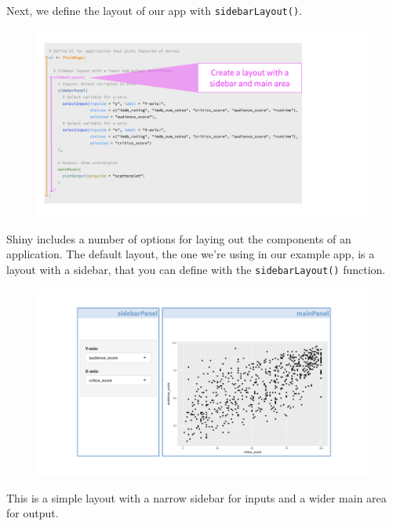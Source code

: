 \documentclass[
  letterpaper,
  DIV=11,
  numbers=noendperiod]{scrreprt}
\begin{document}
Next, we define the layout of our app with \texttt{sidebarLayout()}.

\begin{figure}

{\centering \includegraphics[width=1\textwidth,height=\textheight]{./images/layout.png}

}

\end{figure}

Shiny includes a number of options for laying out the components of an
application. The default layout, the one we're using in our example app,
is a layout with a sidebar, that you can define with the
\texttt{sidebarLayout()} function.

\begin{figure}

{\centering \includegraphics[width=1\textwidth,height=\textheight]{./images/layout-app.png}

}

\end{figure}

This is a simple layout with a narrow sidebar for inputs and a wider
main area for output.
\end{document}
